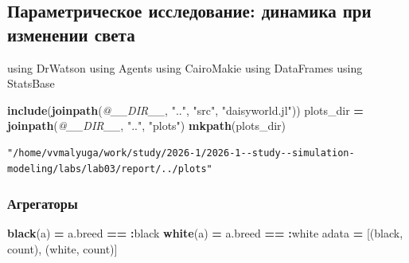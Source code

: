\documentclass[
  english,
  russian,
  12pt,
  a4paper,
  DIV=11,
  numbers=noendperiod]{scrreprt}
\newenvironment{Shaded}{\begin{snugshade}}{\end{snugshade}}
\newcommand{\BuiltInTok}[1]{#1}
\newcommand{\FunctionTok}[1]{\textcolor[rgb]{0.13,0.29,0.53}{\textbf{#1}}}
\newcommand{\ImportTok}[1]{#1}
\newcommand{\NormalTok}[1]{#1}
\newcommand{\OperatorTok}[1]{\textcolor[rgb]{0.81,0.36,0.00}{\textbf{#1}}}
\newcommand{\PreprocessorTok}[1]{\textcolor[rgb]{0.56,0.35,0.01}{\textit{#1}}}
\newcommand{\StringTok}[1]{\textcolor[rgb]{0.31,0.60,0.02}{#1}}
\begin{document}
\subsection{Параметрическое исследование: динамика при изменении
света}\label{ux43fux430ux440ux430ux43cux435ux442ux440ux438ux447ux435ux441ux43aux43eux435-ux438ux441ux441ux43bux435ux434ux43eux432ux430ux43dux438ux435-ux434ux438ux43dux430ux43cux438ux43aux430-ux43fux440ux438-ux438ux437ux43cux435ux43dux435ux43dux438ux438-ux441ux432ux435ux442ux430}

\begin{Shaded}
\begin{Highlighting}[]
\ImportTok{using} \BuiltInTok{DrWatson}
\ImportTok{using} \BuiltInTok{Agents}
\ImportTok{using} \BuiltInTok{CairoMakie}
\ImportTok{using} \BuiltInTok{DataFrames}
\ImportTok{using} \BuiltInTok{StatsBase}

\FunctionTok{include}\NormalTok{(}\FunctionTok{joinpath}\NormalTok{(}\PreprocessorTok{@\_\_DIR\_\_}\NormalTok{, }\StringTok{".."}\NormalTok{, }\StringTok{"src"}\NormalTok{, }\StringTok{"daisyworld.jl"}\NormalTok{))}
\NormalTok{plots\_dir }\OperatorTok{=} \FunctionTok{joinpath}\NormalTok{(}\PreprocessorTok{@\_\_DIR\_\_}\NormalTok{, }\StringTok{".."}\NormalTok{, }\StringTok{"plots"}\NormalTok{)}
\FunctionTok{mkpath}\NormalTok{(plots\_dir)}
\end{Highlighting}
\end{Shaded}

\begin{verbatim}
"/home/vvmalyuga/work/study/2026-1/2026-1--study--simulation-modeling/labs/lab03/report/../plots"
\end{verbatim}

\subsubsection{Агрегаторы}\label{ux430ux433ux440ux435ux433ux430ux442ux43eux440ux44b-2}

\begin{Shaded}
\begin{Highlighting}[]
\FunctionTok{black}\NormalTok{(a) }\OperatorTok{=}\NormalTok{ a.breed }\OperatorTok{==} \OperatorTok{:}\NormalTok{black}
\FunctionTok{white}\NormalTok{(a) }\OperatorTok{=}\NormalTok{ a.breed }\OperatorTok{==} \OperatorTok{:}\NormalTok{white}
\NormalTok{adata }\OperatorTok{=}\NormalTok{ [(black, count), (white, count)]}
\end{Highlighting}
\end{Shaded}
\end{document}
